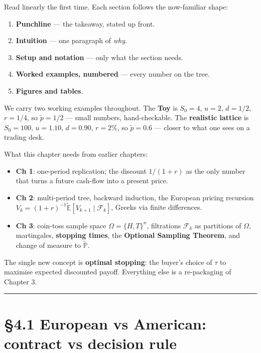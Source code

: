 \documentclass[
  10pt,
  twoside]{book}
\providecommand{\tightlist}{%
  \setlength{\itemsep}{0pt}\setlength{\parskip}{0pt}}
\begin{document}
Read linearly the first time. Each section follows the now-familiar
shape:

\begin{enumerate}
\def\labelenumi{\arabic{enumi}.}
\tightlist
\item
  \textbf{Punchline} --- the takeaway, stated up front.
\item
  \textbf{Intuition} --- one paragraph of \emph{why}.
\item
  \textbf{Setup and notation} --- only what the section needs.
\item
  \textbf{Worked examples, numbered} --- every number on the tree.
\item
  \textbf{Figures and tables}.
\end{enumerate}

We carry two working examples throughout. The \textbf{Toy} is
\(S_0 = 4\), \(u = 2\), \(d = 1/2\), \(r = 1/4\), so \(\tilde p = 1/2\)
--- small numbers, hand-checkable. The \textbf{realistic lattice} is
\(S_0 = 100\), \(u = 1.10\), \(d = 0.90\), \(r = 2\%\), so
\(\tilde p = 0.6\) --- closer to what one sees on a trading desk.

What this chapter needs from earlier chapters:

\begin{itemize}
\tightlist
\item
  \textbf{Ch 1}: one-period replication; the discount \(1/(1+r)\) as the
  only number that turns a future cash-flow into a present price.
\item
  \textbf{Ch 2}: multi-period tree, backward induction, the European
  pricing recursion
  \(V_k = (1+r)^{-1}\tilde{\mathbb{E}}[V_{k+1}\mid\mathcal F_k]\),
  Greeks via finite differences.
\item
  \textbf{Ch 3}: coin-toss sample space \(\Omega = \{H, T\}^n\),
  filtrations \(\mathcal F_k\) as partitions of \(\Omega\), martingales,
  \textbf{stopping times}, the \textbf{Optional Sampling Theorem}, and
  change of measure to \(\tilde{\mathbb{P}}\).
\end{itemize}

The single new concept is \textbf{optimal stopping}: the buyer's choice
of \(\tau\) to maximise expected discounted payoff. Everything else is a
re-packaging of Chapter 3.

\begin{center}\rule{0.5\linewidth}{0.5pt}\end{center}

\section{§4.1 European vs American: contract vs decision
rule}\label{european-vs-american-contract-vs-decision-rule}
\end{document}
